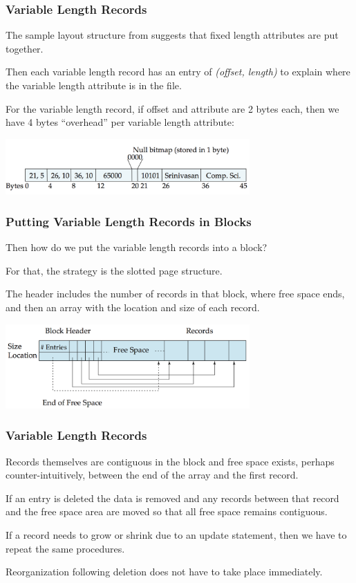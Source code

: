 \begin{frame}
\frametitle{Variable Length Records}

The sample layout structure from suggests that fixed length attributes are put together. 

Then each variable length record has an entry of \textit{(offset, length)}  to explain where the variable length attribute is in the file. 

For the variable length record, if offset and attribute are 2 bytes each, then we have 4 bytes ``overhead'' per variable length attribute:

\begin{center}
\includegraphics[width=0.7\textwidth]{images/variable-length-record}
\end{center}

\end{frame}


\begin{frame}
\frametitle{Putting Variable Length Records in Blocks}
Then how do we put the variable length records into a block? 

For that, the strategy is the \alert{slotted page structure}.

The header includes the number of records in that block, where free space ends, and then an array with the location and size of each record.

\begin{center}
\includegraphics[width=0.7\textwidth]{images/slotted-page}
\end{center}

\end{frame}


\begin{frame}
\frametitle{Variable Length Records}

Records themselves are contiguous in the block and free space exists, perhaps counter-intuitively, between the end of the array and the first record.

If an entry is deleted the data is removed and any records between that record and the free space area are moved so that all free space remains contiguous.

If a record needs to grow or shrink due to an update statement, then we have to repeat the same procedures.

Reorganization following deletion does not have to take place immediately.

\end{frame}



